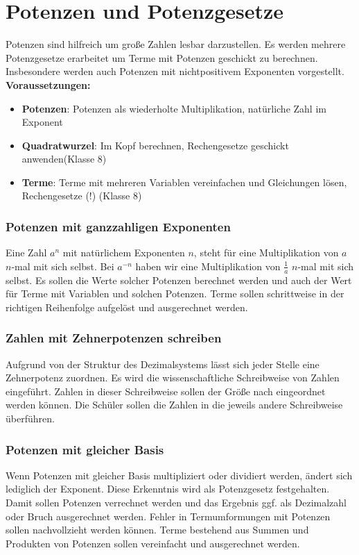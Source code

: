 \documentclass{article}
\begin{document}
\newpage
\section{Potenzen und Potenzgesetze}
Potenzen sind hilfreich um große Zahlen lesbar darzustellen. Es werden mehrere Potenzgesetze erarbeitet um Terme mit Potenzen geschickt zu berechnen.
Insbesondere werden auch Potenzen mit nichtpositivem Exponenten vorgestellt.\\
\textbf{Voraussetzungen:}
\begin{itemize}
    \item \textbf{Potenzen}: Potenzen als wiederholte Multiplikation, natürliche Zahl im Exponent
    \item \textbf{Quadratwurzel}: Im Kopf berechnen, Rechengesetze geschickt anwenden(Klasse 8) 
    \item \textbf{Terme}: Terme mit mehreren Variablen vereinfachen und Gleichungen lösen, Rechengesetze (!) (Klasse 8)
\end{itemize}

\subsubsection*{Potenzen mit ganzzahligen Exponenten}
Eine Zahl $a^n$ mit natürlichem Exponenten $n$, steht für eine Multiplikation von $a$ $n$-mal mit sich selbst.
Bei $a^{-n}$ haben wir eine Multiplikation von $\frac{1}{a}$ $n$-mal mit sich selbst.
Es sollen die Werte solcher Potenzen berechnet werden und auch der Wert für Terme mit Variablen und solchen Potenzen.
Terme sollen schrittweise in der richtigen Reihenfolge aufgelöst und ausgerechnet werden.
\subsubsection*{Zahlen mit Zehnerpotenzen schreiben}
Aufgrund von der Struktur des Dezimalsystems lässt sich jeder Stelle eine Zehnerpotenz zuordnen.
Es wird die wissenschaftliche Schreibweise von Zahlen eingeführt. Zahlen in dieser Schreibweise sollen der Größe nach eingeordnet werden können.
Die Schüler sollen die Zahlen in die jeweils andere Schreibweise überführen.
\subsubsection*{Potenzen mit gleicher Basis}
Wenn Potenzen mit gleicher Basis multipliziert oder dividiert werden, ändert sich lediglich der Exponent. Diese Erkenntnis wird als Potenzgesetz festgehalten.
Damit sollen Potenzen verrechnet werden und das Ergebnis ggf. als Dezimalzahl oder Bruch ausgerechnet werden.
Fehler in Termumformungen mit Potenzen sollen nachvollzieht werden können.
Terme bestehend aus Summen und Produkten von Potenzen sollen vereinfacht und ausgerechnet werden.
\end{document}

